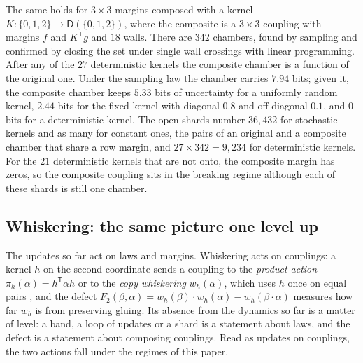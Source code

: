 \documentclass[11pt]{article}
\theoremstyle{definition}
\theoremstyle{remark}
\newcommand{\D}{\mathsf{D}}
\newcommand{\T}{\mathsf T}
\begin{document}
The same holds for $3\times3$ margins composed with a kernel $K\colon\{0,1,2\}\to\D(\{0,1,2\})$, where the composite is a $3\times3$ coupling with margins
$f$ and $K^\T g$ and $18$ walls. There are $342$ chambers, found by sampling and confirmed by closing the set under single wall
crossings with linear programming. After any of the $27$ deterministic kernels the composite chamber is a function of the original one.
Under the sampling law the chamber carries $7.94$ bits; given it, the composite chamber keeps $5.33$ bits of uncertainty for a uniformly
random kernel, $2.44$ bits for the fixed kernel with diagonal $0.8$ and off-diagonal $0.1$, and $0$ bits for a deterministic kernel. The
open shards number $36{,}432$ for stochastic kernels and as many for constant ones, the pairs of an original and a composite chamber that
share a row margin, and $27\times342=9{,}234$ for deterministic kernels. For the $21$ deterministic kernels that are not onto, the composite margin has zeros,
so the composite coupling sits in the breaking regime although each of these shards is still one chamber.

\subsection{Whiskering: the same picture one level up}

The updates so far act on laws and margins. Whiskering acts on couplings: a kernel $h$ on the second coordinate sends a coupling to the
\emph{product action} $\pi_h(\alpha)=h^\T\alpha h$ or to the \emph{copy whiskering} $w_h(\alpha)$, which uses $h$ once on equal pairs
\cite[\S4]{Algebras}, and the defect $F_2(\beta,\alpha)=w_h(\beta)\cdot w_h(\alpha)-w_h(\beta\cdot\alpha)$ measures how far $w_h$ is from preserving
gluing. Its absence from the dynamics so far is a matter of level: a band, a loop of updates or a shard is a statement about laws, and
the defect is a statement about composing couplings. Read as updates on couplings, the two actions fall under the regimes of this paper.
\end{document}
